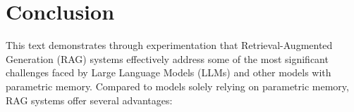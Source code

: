 \documentclass{wseas}
\begin{document}


\section{Conclusion}

This text demonstrates through experimentation that Retrieval-Augmented
Generation (RAG) systems effectively address some of the most
significant challenges faced by Large Language Models (LLMs) and other
models with parametric memory. Compared to models solely relying on
parametric memory, RAG systems offer several advantages:
\end{document}

